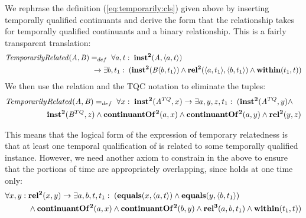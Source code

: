 We rephrase the definition (\ref{eq:temporarily:cls}) given above by inserting
temporally qualified continuants and derive the form that the relationship takes
for temporally qualified continuants and a binary relationship. This is a fairly
transparent translation:
\begin{equation}
\begin{split}
\mathit{TemporarilyRelated}(\mathit{A},\mathit{B})& =_{def}\;
\forall a, t:\; \mathrm{\mathbf{inst^2}}(\mathit{A}, \langle a,t\rangle) \\
&\ \rightarrow
\exists b, t_1:\;(\mathrm{\mathbf{inst^2}}(\mathit{B}\langle b,t_1\rangle) \wedge
\mathrm{\mathbf{rel^2}}(\langle a,t_1\rangle,\langle b,t_1\rangle) \wedge \mathrm{\mathbf{within}}(t_1,t))
\end{split}
\end{equation}
We then use the  relation and the TQC notation to eliminate
the tuples:
\begin{equation}
\begin{split}
\mathit{Temporarily}&\mathit{Related}(\mathit{A},\mathit{B}) =_{def}\;
\forall x:\; \mathrm{\mathbf{inst^2}}(\mathit{A}^{TQ}, x)
 \rightarrow
\exists a,y,z,t_1:\;(\mathrm{\mathbf{inst^2}}(\mathit{A}^{TQ},y) \wedge \\ & \mathrm{\mathbf{inst^2}}(\mathit{B}^{TQ},z)
 \wedge \mathrm{\mathbf{continuantOf^2}}(a,x) \wedge \mathrm{\mathbf{continuantOf^2}}(a,y) \wedge
\mathrm{\mathbf{rel^2}}(y,z)
\end{split}
\label{eq:usesSame}
\end{equation}


This means that the logical form of the expression of temporary relatedness is that
at least one temporal qualification of  is related to some temporally
qualified  instance.
However, we need another axiom to constrain  in the above to ensure that the
portions of time are appropriately overlapping, since  holds at one time
only:
\begin{equation}
\begin{split}
\forall x,y:\;& \mathrm{\mathbf{rel^2}}(x,y) \rightarrow \exists a,b,t,t_1:\;
(\mathrm{\mathbf{equals}}(x,\langle a,t\rangle)\wedge \mathrm{\mathbf{equals}}(y,\langle b,t_1\rangle)\\
& \wedge \mathrm{\mathbf{continuantOf^2}}(a,x) \wedge \mathrm{\mathbf{continuantOf^2}}(b,y) \wedge
\mathrm{\mathbf{rel^3}}(a,b,t_1) \wedge \mathrm{\mathbf{within}}(t_1,t))
\end{split}
\end{equation}

